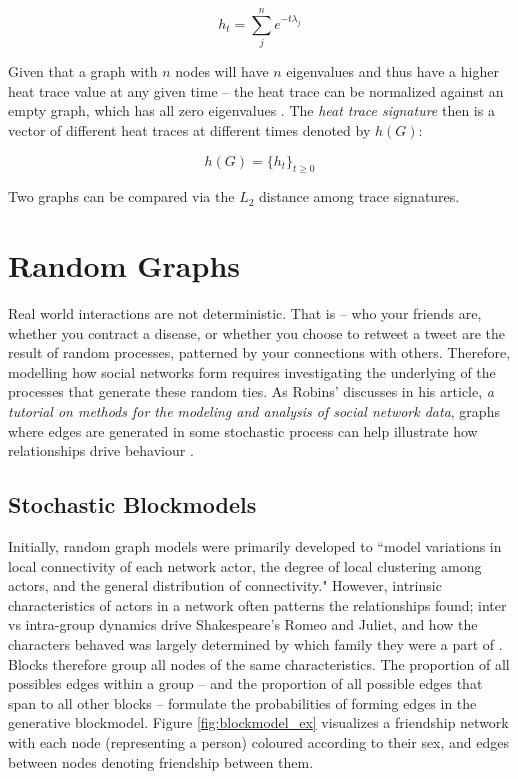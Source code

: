 \begin{equation}\label{equation:heat_trace}
    h_{t}=\sum_{j}^{n}e^{-t\lambda_{j}}
\end{equation}
 
Given that a graph with $n$ nodes will have $n$ eigenvalues and thus have a
higher heat trace value at any given time -- the heat trace can be normalized
against an empty graph, which has all zero eigenvalues \cite{netlsd}. The
\emph{heat trace signature} then is a vector of different heat traces at
different times denoted by $h(G)$:

\begin{equation}\label{equation:heat_trace_sig}
    h(G) = \{h_{t}\}_{t\geq0}
\end{equation}

Two graphs can be compared via the $L_{2}$ distance among trace signatures.

\section{Random Graphs}\label{sec:RandomGraphs}
    
Real world interactions are not deterministic. That is -- who your friends are,
whether you contract a disease, or whether you choose to retweet a tweet are the
result of random processes, patterned by your connections with others.
Therefore, modelling how social networks form requires investigating the
underlying of the processes that generate these random ties. As Robins'
discusses in his article,\emph{ a tutorial on methods for the modeling and
analysis of social network data}, graphs where edges are generated in some
stochastic process can help illustrate how relationships drive behaviour
\cite{robins2013tutorial}.  

\subsection{Stochastic Blockmodels}\label{sec:SBM}

Initially, random graph models were primarily developed to ``model  variations
in local connectivity of each network actor, the degree of local clustering
among actors, and the general distribution of connectivity."
\cite{robins2013tutorial} However, intrinsic characteristics of actors in a
network often patterns the relationships found; inter vs intra-group dynamics
drive Shakespeare's Romeo and Juliet, and how the characters behaved was largely
determined by which family they were a part of \cite{doreian2005generalized}.
Blocks therefore group all nodes of the same characteristics. The proportion of
all possibles edges within a group -- and the proportion of all possible edges
that span to all other blocks -- formulate the probabilities of forming edges in
the generative blockmodel. Figure \ref{fig:blockmodel_ex} visualizes a
friendship network with each node (representing a person) coloured according to
their sex, and edges between nodes denoting friendship between them.

